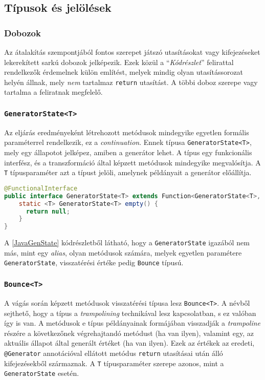 \subsection{Típusok és jelölések}

\subsubsection{Dobozok}

Az átalakítás szempontjából fontos szerepet játszó utasításokat vagy kifejezéseket lekerekített sarkú dobozok jelképezik. Ezek közül a ``\textit{Kódrészlet}'' felirattal rendelkezők érdemelnek külön említést, melyek mindig olyan utasítássorozat helyén állnak, mely \textit{nem} tartalmaz \texttt{return} utasítást. A többi doboz szerepe vagy tartalma a feliratnak megfelelő.

\subsubsection{\texttt{GeneratorState<T>}}

Az eljárás eredményeként létrehozott metódusok mindegyike egyetlen formális paraméterrel rendelkezik, ez a \textit{continuation}. Ennek típusa \texttt{GeneratorState<T>}, mely egy állapotot jelképez, amiben a generátor lehet. A típus egy funkcionális interfész, és a transzformáció által képzett metódusok mindegyike megvalósítja. A \texttt{T} típusparaméter azt a típust jelöli, amelynek példányait a generátor előállítja.

\begin{lstlisting}[language=Java, caption={A \texttt{GeneratorState<T>} interfész}, captionpos=b, label=JavaGenState, escapechar=$]
@FunctionalInterface
public interface GeneratorState<T> extends Function<GeneratorState<T>, Bounce<T>> {
    static <T> GeneratorState<T> empty() { 
      return null; 
    }
}
\end{lstlisting}

A \ref{JavaGenState} kódrészletből látható, hogy a \texttt{GeneratorState} igazából nem más, mint egy \textit{alias}, olyan metódusok számára, melyek egyetlen paramétere \texttt{GeneratorState}, visszatérési értéke pedig \texttt{Bounce} típusú.

\subsubsection{\texttt{Bounce<T>}}

A vágás során képzett metódusok visszatérési típusa lesz \texttt{Bounce<T>}. A névből sejthető, hogy a típus a \textit{trampolining} technikával lesz kapcsolatban, s ez valóban így is van. A metódusok e típus példányainak formájában visszadják a \textit{trampoline} részére a következőnek végrehajtandó metódust (ha van ilyen), valamint egy, az aktuális állapot által generált értéket (ha van ilyen). Ezek az értékek az eredeti, \texttt{@Generator} annotációval ellátott metódus \texttt{return} utasításai után álló kifejezésekből származnak. A \texttt{T} típusparaméter szerepe azonos, mint a \texttt{GeneratorState} esetén.

